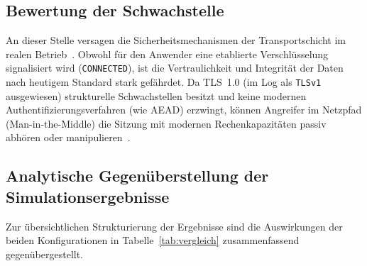 \subsection*{Bewertung der Schwachstelle}
An dieser Stelle versagen die Sicherheitsmechanismen der Transportschicht im realen Betrieb~\cite{sentinelone}. Obwohl für den Anwender eine etablierte Verschlüsselung signalisiert wird (\texttt{CONNECTED}), ist die Vertraulichkeit und Integrität der Daten nach heutigem Standard stark gefährdet. Da TLS~1.0 (im Log als \texttt{TLSv1} ausgewiesen) strukturelle Schwachstellen besitzt und keine modernen Authentifizierungsverfahren (wie AEAD) erzwingt, können Angreifer im Netzpfad (Man-in-the-Middle) die Sitzung mit modernen Rechenkapazitäten passiv abhören oder manipulieren~\cite{sentinelone, mdndocs}.

\subsection{Analytische Gegenüberstellung der Simulationsergebnisse}
Zur übersichtlichen Strukturierung der Ergebnisse sind die Auswirkungen der beiden Konfigurationen in Tabelle~\ref{tab:vergleich} zusammenfassend gegenübergestellt.

\begin{table}[ht]
\caption{Vergleichsmatrix der simulierten TLS-Fehlerfälle}
\label{tab:vergleich}
\centering
\footnotesize
\renewcommand{\arraystretch}{1.3}
\end{table}